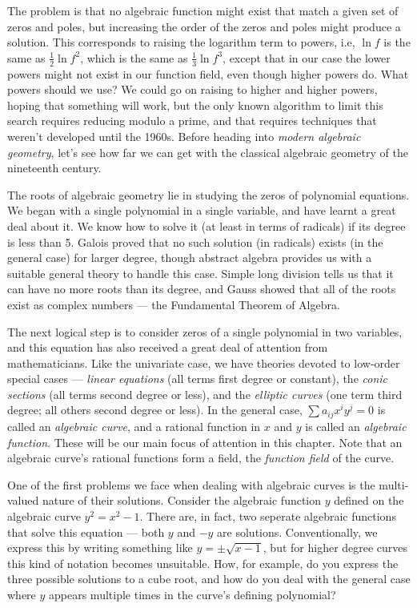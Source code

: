 The problem is that no algebraic function might exist that match a
given set of zeros and poles, but increasing the order of the zeros
and poles might produce a solution.  This corresponds to raising the
logarithm term to powers, i.e, $\ln f$ is the same as $\frac{1}{2} \ln
f^2$, which is the same as $\frac{1}{3} \ln f^3$, except that in our
case the lower powers might not exist in our function field, even
though higher powers do.  What powers should we use?  We could go on
raising to higher and higher powers, hoping that something will work,
but the only known algorithm to limit this search requires reducing
modulo a prime, and that requires techniques that weren't developed
until the 1960s.  Before heading into {\it modern algebraic geometry},
let's see how far we can get with the classical algebraic geometry of
the nineteenth century.


The roots of algebraic geometry lie in studying the zeros of
polynomial equations.  We began with a single polynomial in a single
variable, and have learnt a great deal about it.  We know how to solve
it (at least in terms of radicals) if its degree is less than 5.
Galois proved that no such solution (in radicals) exists (in the
general case) for larger degree, though abstract algebra provides us
with a suitable general theory to handle this case.  Simple long
division tells us that it can have no more roots than its degree, and
Gauss showed that all of the roots exist as complex numbers --- the
Fundamental Theorem of Algebra.

The next logical step is to consider zeros of a single polynomial in
two variables, and this equation has also received a great deal of
attention from mathematicians.  Like the univariate case, we have
theories devoted to low-order special cases --- {\it linear equations}
(all terms first degree or constant), the {\it conic sections} (all
terms second degree or less), and the {\it elliptic curves} (one term
third degree; all others second degree or less).  In the general case,
$\sum a_{ij} x^i y^j = 0$ is called an {\it algebraic curve}, and a
rational function in $x$ and $y$ is called an {\it algebraic
function}.  These will be our main focus of attention in this chapter.
Note that an algebraic curve's rational functions form a field, the
{\it function field} of the curve.

One of the first problems we face when dealing with algebraic curves
is the multi-valued nature of their solutions.  Consider the algebraic
function $y$ defined on the algebraic curve $y^2 = x^2 - 1$.  There
are, in fact, two seperate algebraic functions that solve this
equation --- both $y$ and $-y$ are solutions.  Conventionally, we
express this by writing something like $y = \pm\sqrt{x-1}$, but for
higher degree curves this kind of notation becomes unsuitable.  How,
for example, do you express the three possible solutions to a cube
root, and how do you deal with the general case where $y$ appears
multiple times in the curve's defining polynomial?

